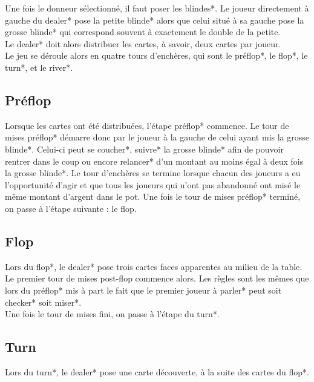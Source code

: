 \documentclass{report}
\begin{document}
Une fois le donneur sélectionné, il faut poser les blindes*. Le joueur directement à gauche du dealer* pose la petite blinde* alors que celui situé à sa gauche pose la grosse blinde* qui correspond souvent à exactement le double de la petite.\\

Le dealer* doit alors distribuer les cartes, à savoir, deux cartes par joueur. \\

Le jeu se déroule alors en quatre tours d'enchères, qui sont le préflop*, le flop*, le turn*, et le river*.\par

\subsection{Préflop}
\hspace{0.5cm}Lorsque les cartes ont été distribuées, l'étape préflop* commence. Le tour de mises préflop* démarre donc par le joueur à la gauche de celui ayant mis la grosse blinde*. Celui-ci peut se coucher*, suivre* la grosse blinde* afin de pouvoir rentrer dans le coup ou encore relancer* d'un montant au moins égal à deux fois la grosse blinde*. Le tour d'enchères se termine lorsque chacun des joueurs a eu l'opportunité d'agir et que tous les joueurs qui n'ont pas abandonné ont misé le même montant d'argent dans le pot. Une fois le tour de mises préflop* terminé, on passe à l'étape suivante : le flop.\par

\subsection{Flop}
\hspace{0.5cm}Lors du flop*, le dealer* pose trois cartes faces apparentes au milieu de la table. Le premier tour de mises post-flop commence alors. Les règles sont les mêmes que lors du préflop* mis à part le fait que le premier joueur à parler* peut soit checker* soit miser*.\\

Une fois le tour de mises fini, on passe à l'étape du turn*.\par
\subsection{Turn}
\hspace{0.5cm}Lors du turn*, le dealer* pose une carte découverte, à la suite des cartes du flop*. \\
\end{document}
